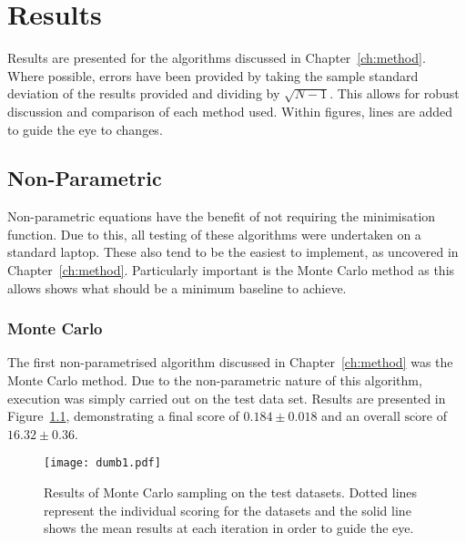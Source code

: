 \chapter{Results}










\graphicspath{{Chapter4/Figs/Vector/}{Chapter4/Figs/}}
Results are presented for the algorithms discussed in Chapter~\ref{ch:method}. Where possible, errors have been provided by taking the sample standard deviation of the results provided and dividing by $\sqrt{N-1}$. This allows for robust discussion and comparison of each method used. Within figures, lines are added to guide the eye to changes.

\section{Non-Parametric}
Non-parametric equations have the benefit of not requiring the minimisation function. Due to this, all testing of these algorithms were undertaken on a standard laptop. These also tend to be the easiest to implement, as uncovered in Chapter~\ref{ch:method}. Particularly important is the Monte Carlo method as this allows shows what should be a minimum baseline to achieve.

\subsection{Monte Carlo}
The first non-parametrised algorithm discussed in Chapter~\ref{ch:method} was the Monte Carlo method. Due to the non-parametric nature of this algorithm, execution was simply carried out on the test data set. Results are presented in Figure~\ref{fig:MCTestSet}, demonstrating a final score of ${0.184\pm{}0.018}$ and an overall $\dot{\mathrm{score}}$ of $16.32\pm{}0.36$.

\begin{figure}[H]
    \begin{center}
        \texttt{[image: dumb1.pdf]}
        \caption[Monte Carlo]{Results of Monte Carlo sampling on the test datasets. Dotted lines represent the individual scoring for the datasets and the solid line shows the mean results at each iteration in order to guide the eye.}
        \label{fig:MCTestSet}
    \end{center}
\end{figure}

